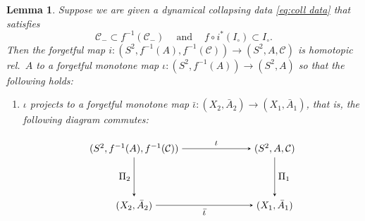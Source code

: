 \documentclass{amsart}
\theoremstyle{plain}
\newtheorem{lemma}[theorem]{Lemma}
\theoremstyle{definition}
\theoremstyle{remark}
\renewcommand{\sp}{{\ \ }}
\newcommand{\CC}{{\mathcal C}}
\begin{document}
\begin{lemma}
\label{lem:bar iota}
Suppose we are given a dynamical collapsing data \eqref{eq:coll data} that satisfies 
\begin{equation}
\label{lem:bar iota:assump}
\CC_-\subset  f^{-1}(\CC_-) \sp\sp\text{ and }\sp\sp f\circ i^* (I_\circ)\subset I_\circ.
\end{equation}
Then the forgetful map $i\colon (S^2,f^{-1}(A),f^{-1}(\CC)) \to (S^2,A,\CC)$ is homotopic rel.\ $A$ to a forgetful monotone map $\iota\colon (S^2,f^{-1}(A))\to (S^2, A)$ so that the following holds:
\begin{enumerate}[label=\text{(\roman*)},font=\normalfont,leftmargin=*]

\item\label{lem:bar iota:assump:cond1}  $\iota$ projects to a forgetful monotone map $\bar \iota\colon (X_2, \bar A_2)\to (X_1, \bar A_1)$, that is, the following diagram commutes:

\begin{equation}
\label{eq:bar iota}
{\begin{tikzpicture}
  \matrix (m) [matrix of math nodes,row sep=4em,column sep=7em,minimum width=2em]
  {
     (S^2,f^{-1}(A),f^{-1}(\CC)) &(S^2,A,\CC) \\
     (X_2,\bar A_2) & (X_1,\bar A_1) \\};
  \path[-stealth]
    (m-1-1) edge node [left] {$\Pi_2 $} (m-2-1)
            edge  node [above] {$\iota $} (m-1-2)
    (m-2-1.east|-m-2-2) edge node [below] {$\bar \iota$}
          (m-2-2)
    (m-1-2) edge node [right] {$\Pi_1$} (m-2-2);
\end{tikzpicture}}
\end{equation}



\end{enumerate}
\end{lemma}
\end{document}

